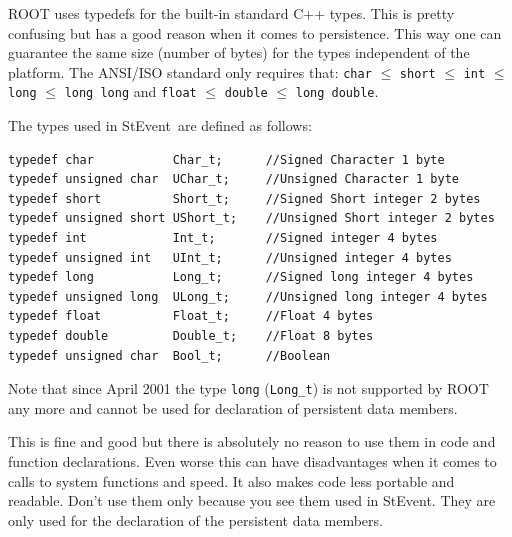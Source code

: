 \documentclass[twoside]{article}
\newcommand{\StEvent}{\textsf{StEvent}}
\begin{document}
ROOT uses typedefs for the built-in standard C++ types. This is pretty
confusing but has a good reason when it comes to persistence. This way
one can guarantee the same size (number of bytes) for the types
independent of the platform.  The ANSI/ISO standard only requires
that: \texttt{char} $\le$ \texttt{short} $\le$ \texttt{int} $\le$
\texttt{long} $\le$ \texttt{long long} and \texttt{float} $\le$
\texttt{double} $\le$ \texttt{long double}.

The types used in \StEvent\ are defined as follows:
\begin{verbatim}
typedef char           Char_t;      //Signed Character 1 byte
typedef unsigned char  UChar_t;     //Unsigned Character 1 byte
typedef short          Short_t;     //Signed Short integer 2 bytes
typedef unsigned short UShort_t;    //Unsigned Short integer 2 bytes
typedef int            Int_t;       //Signed integer 4 bytes
typedef unsigned int   UInt_t;      //Unsigned integer 4 bytes
typedef long           Long_t;      //Signed long integer 4 bytes
typedef unsigned long  ULong_t;     //Unsigned long integer 4 bytes
typedef float          Float_t;     //Float 4 bytes
typedef double         Double_t;    //Float 8 bytes
typedef unsigned char  Bool_t;      //Boolean
\end{verbatim}

Note that since April 2001 the type \texttt{long} (\texttt{Long\_t}) is not supported
by ROOT any more and cannot be used for declaration of persistent data members.

This is fine and good but there is absolutely no reason to use them in
code and function declarations.  Even worse
this can have disadvantages when it comes to calls to system functions
and speed. It also makes code less portable and readable.  Don't use
them only because you see them used in \StEvent. They are only used
for the declaration of the persistent data members.
\end{document}
